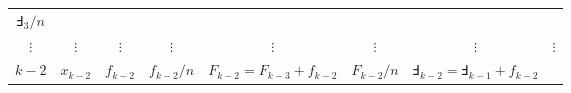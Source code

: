 \documentclass[
]{book}
\theoremstyle{definition}
\theoremstyle{definition}
\theoremstyle{definition}
\theoremstyle{remark}
\begin{document}
\begin{longtable}[]{@{}cccccccc@{}}
\begin{minipage}[t]{0.10\columnwidth}
\(\Finv_{3}/n\)\strut
\end{minipage}\tabularnewline
\begin{minipage}[t]{0.06\columnwidth}\centering
\(\vdots\)\strut
\end{minipage} & \begin{minipage}[t]{0.06\columnwidth}\centering
\(\vdots\)\strut
\end{minipage} & \begin{minipage}[t]{0.06\columnwidth}\centering
\(\vdots\)\strut
\end{minipage} & \begin{minipage}[t]{0.07\columnwidth}\centering
\(\vdots\)\strut
\end{minipage} & \begin{minipage}[t]{0.15\columnwidth}\centering
\(\vdots\)\strut
\end{minipage} & \begin{minipage}[t]{0.07\columnwidth}\centering
\(\vdots\)\strut
\end{minipage} & \begin{minipage}[t]{0.20\columnwidth}\centering
\(\vdots\)\strut
\end{minipage} & \begin{minipage}[t]{0.10\columnwidth}\centering
\(\vdots\)\strut
\end{minipage}\tabularnewline
\begin{minipage}[t]{0.06\columnwidth}\centering
\(k-2\)\strut
\end{minipage} & \begin{minipage}[t]{0.06\columnwidth}\centering
\(x_{k-2}\)\strut
\end{minipage} & \begin{minipage}[t]{0.06\columnwidth}\centering
\(f_{k-2}\)\strut
\end{minipage} & \begin{minipage}[t]{0.07\columnwidth}\centering
\(f_{k-2}/n\)\strut
\end{minipage} & \begin{minipage}[t]{0.15\columnwidth}\centering
\(F_{k-2}=F_{k-3}+f_{k-2}\)\strut
\end{minipage} & \begin{minipage}[t]{0.07\columnwidth}\centering
\(F_{k-2}/n\)\strut
\end{minipage} & \begin{minipage}[t]{0.20\columnwidth}\centering
\(\Finv_{k-2}=\Finv_{k-1}+f_{k-2}\)\strut
\end{minipage} & \begin{minipage}[t]{0.10\columnwidth}\centering

\end{minipage}
\end{longtable}
\end{document}
